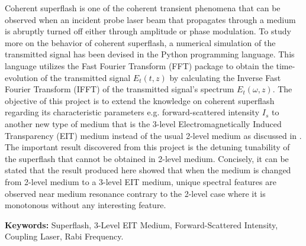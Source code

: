 
Coherent superflash is one of the coherent transient phenomena that can be observed when an incident probe laser beam that propagates through a medium is abruptly turned off either through amplitude or phase modulation. To study more on the behavior of coherent superflash, a numerical simulation of the transmitted signal has been devised in the Python programming language. This language utilizes the Fast Fourier Transform (FFT) package to obtain the time-evolution of the transmitted signal $E_{t}(t, z)$ by calculating the Inverse Fast Fourier Transform (IFFT) of the transmitted signal's spectrum $E_{t}(\omega, z)$. The objective of this project is to extend the knowledge on coherent superflash regarding its characteristic parameters e.g. forward-scattered intensity $I_{s}$ to another new type of medium that is the 3-level Electromagnetically Induced Transparency (EIT) medium instead of the usual 2-level medium as discussed in \cite{Kwong2014}. The important result discovered from this project is the detuning tunability of the superflash that cannot be obtained in 2-level medium. Concisely, it can be stated that the result produced here showed that when the medium is changed from 2-level medium to a 3-level EIT medium, unique spectral features are observed near medium resonance contrary to the 2-level case where it is monotonous without any interesting feature.

\textbf{Keywords: } Superflash, 3-Level EIT Medium, Forward-Scattered Intensity, Coupling Laser, Rabi Frequency.
